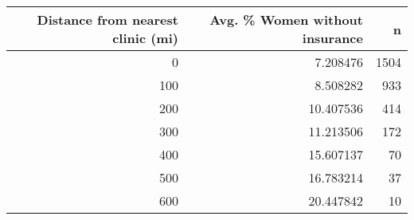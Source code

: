 \documentclass[
]{article}
\begin{document}
\begin{longtable}[]{@{}rrr@{}}
\toprule
Distance from nearest clinic (mi) & Avg. \% Women without insurance &
n \\
\midrule
\endhead
0 & 7.208476 & 1504 \\
100 & 8.508282 & 933 \\
200 & 10.407536 & 414 \\
300 & 11.213506 & 172 \\
400 & 15.607137 & 70 \\
500 & 16.783214 & 37 \\
600 & 20.447842 & 10 \\
\bottomrule
\end{longtable}
\end{document}

